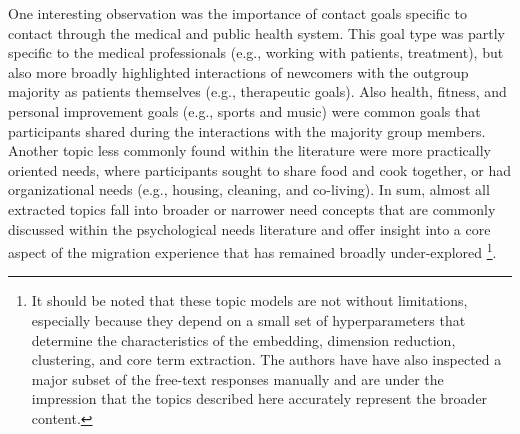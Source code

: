 One interesting observation was the importance of contact goals specific
to contact through the medical and public health system. This goal type
was partly specific to the medical professionals (e.g., working with
patients, treatment), but also more broadly highlighted interactions of
newcomers with the outgroup majority as patients themselves (e.g.,
therapeutic goals). Also health, fitness, and personal improvement goals
(e.g., sports and music) were common goals that participants shared
during the interactions with the majority group members. Another topic
less commonly found within the literature were more practically oriented
needs, where participants sought to share food and cook together, or had
organizational needs (e.g., housing, cleaning, and co-living). In sum,
almost all extracted topics fall into broader or narrower need concepts
that are commonly discussed within the psychological needs literature
\citep[e.g.,][]{Orehek2018a} and offer insight into a core aspect of the
migration experience that has remained broadly under-explored
\citep[][]{Kreienkamp2022d}\footnote{It should be noted that these topic models are not without limitations, especially because they depend on a small set of hyperparameters that determine the characteristics of the embedding, dimension reduction, clustering, and core term extraction. The authors have have also inspected a major subset of the free-text responses manually and are under the impression that the topics described here accurately represent the broader content.}.
